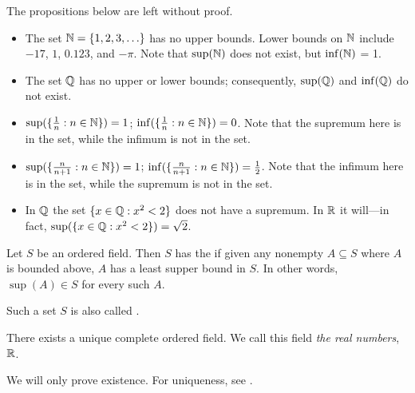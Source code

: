 \documentclass[11pt,twoside=off,numbers=noenddot]{scrbook}
\begin{document}
\begin{example}
    The propositions below are left without proof.
    \begin{itemize}
        \item The set $\NN = \set{1, 2, 3, \dots}$ has no upper bounds. Lower bounds on $\mathbb N$ include $-17$, $1$, $0.123$, and $-\pi$. Note that $\sup(\mathbb N)$ does not exist, but $\inf(\mathbb N)$ = 1.
        \item The set $\mathbb Q$ has no upper or lower bounds; consequently, $\sup(\mathbb Q)$ and $\inf(\mathbb Q)$ do not exist.
        \item $\sup(\{ \frac{1}{n} : n \in \mathbb N \}) = 1$; $\inf(\{ \frac{1}{n} : n \in \mathbb N \}) = 0$. Note that the supremum here is in the set, while the infimum is not in the set.
        \item $\sup(\{ \frac{n}{n + 1} : n \in \mathbb N \}) = 1$; $\inf(\{ \frac{n}{n + 1} : n \in \mathbb N \}) = \frac{1}{2}$. Note that the infimum here is in the set, while the supremum is not in the set.
        \item In $\mathbb Q$ the set $\{ x \in \mathbb Q : x^2 < 2 \}$ does not have a supremum. In $\mathbb R$ it will—in fact, $\sup(\{ x \in \mathbb Q : x^2 < 2 \}) = \sqrt{2}$.
    \end{itemize}
\end{example}

\begin{definition}[Completeness]
    Let $S$ be an ordered field. Then $S$ has the  if given any nonempty $A \subseteq S$ where $A$ is bounded above, $A$ has a least supper bound in $S$. In other words, $\sup(A) \in S$ for every such $A$.

    Such a set $S$ is also called .
\end{definition}

\begin{theorem}
    There exists a unique complete ordered field. We call this field \textit{the real numbers}, $\mathbb R$.
\end{theorem}

We will only prove existence. For uniqueness, see .
\end{document}
